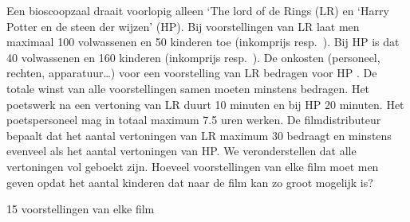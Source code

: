 \begin{oef}
Een bioscoopzaal draait voorlopig alleen 
    `The lord of de Rings (LR) en `Harry Potter en de steen der wijzen' (HP). Bij 
     voorstellingen van LR laat men maximaal 100 volwassenen en 50 
     kinderen toe (inkomprijs  resp.\ ). Bij HP is dat 
     40 volwassenen en 160 kinderen (inkomprijs  resp.\ 
     ).  De onkosten 
     (personeel, rechten, apparatuur\ldots) voor 
     een voorstelling van LR bedragen  voor HP .  De 
     totale winst van alle voorstellingen samen moeten minstens 
     \euros{21600} bedragen. Het poetswerk na een vertoning van LR duurt 
     10 minuten en bij HP 20 minuten. Het poetspersoneel mag in totaal  
     maximum 7.5 uren werken. De filmdistributeur bepaalt dat het aantal 
     vertoningen van LR  maximum 30 bedraagt en minstens 
     evenveel als het aantal vertoningen van HP. We veronderstellen 
          dat alle vertoningen vol geboekt zijn.
     Hoeveel voorstellingen van elke film moet men geven opdat het aantal 
     kinderen dat naar de film kan zo groot mogelijk is? 
     \begin{opl}
     15 voorstellingen van elke film
     \end{opl}
\end{oef}
     

